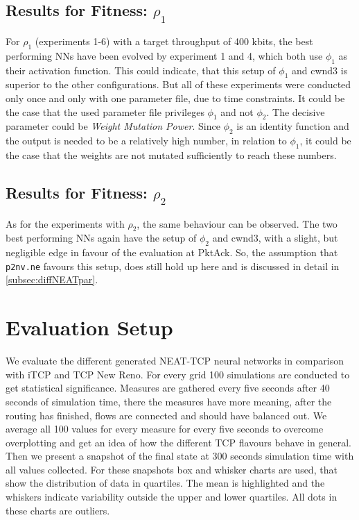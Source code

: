 \subsection{Results for Fitness: $\rho_1$}\label{subsec:resultsFitness1}
 For $\rho_1$ (experiments 1-6) with a target throughput of 400 kbits, the best performing NNs have been evolved by experiment 1 and 4, which both use $\phi_1$ as their activation function. This could indicate, that this setup of $\phi_1$ and cwnd3 is superior to the other configurations. But all of these experiments were conducted only once and only with one parameter file, due to time constraints. It could be the case that the used parameter file privileges $\phi_1$ and not $\phi_2$. The decisive parameter could be \textit{Weight Mutation Power}.  Since $\phi_2$ is an identity function and the output is needed to be a relatively high number, in relation to $\phi_1$, it could be the case that the weights are not mutated sufficiently to reach these numbers. 

 
\subsection{Results for Fitness: $\rho_2$}\label{subsec:resultsFitness2}
As for the experiments with $\rho_2$, the same behaviour can be observed. The two best performing NNs again have the setup of $\phi_2$ and cwnd3, with a slight, but negligible edge in favour of the evaluation at PktAck. So, the assumption that \texttt{p2nv.ne} favours this setup, does still hold up here and is discussed in detail in \autoref{subsec:diffNEATpar}.
  
\section{Evaluation Setup}\label{sec:evalSetup}
We evaluate the different generated NEAT-TCP neural networks in comparison with iTCP and TCP New Reno. For every grid 100 simulations are conducted to get statistical significance. Measures are gathered every five seconds after 40 seconds of simulation time, there the measures have more meaning, after the routing has finished, flows are connected and should have balanced out. We average all 100 values for every measure for every five seconds to overcome overplotting and get an idea of how the different TCP flavours behave in general. Then we present a snapshot of the final state at 300 seconds simulation time with all values collected. For these snapshots box and whisker charts are used, that show the distribution of data in quartiles. The mean is highlighted and the whiskers indicate variability outside the upper and lower quartiles. All dots in these charts are outliers.

